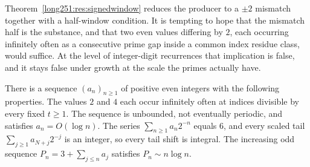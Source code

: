 \documentclass[11pt]{article}
\begin{document}
Theorem~\ref{long251:res:signedwindow} reduces the producer to a $\pm2$ mismatch
together with a half-window condition.  It is tempting to hope that the
mismatch half is the substance, and that two even values differing by $2$, each
occurring infinitely often as a consecutive prime gap inside a common index
residue class, would suffice.  At the level of integer-digit recurrences that
implication is false, and it stays false under growth at the scale the primes
actually have.

\begin{theorem}\label{long251:res:polignacfail}
There is a sequence $(a_n)_{n\ge1}$ of positive even integers with the
following properties.  The values $2$ and $4$ each occur infinitely often at
indices divisible by every fixed $t\ge1$.  The sequence is unbounded, not
eventually periodic, and satisfies $a_n=O(\log n)$.  The series
$\sum_{n\ge1}a_n2^{-n}$ equals $6$, and every scaled tail
$\sum_{j\ge1}a_{N+j}2^{-j}$ is an integer, so every tail shift is integral.
The increasing odd sequence $P_n=3+\sum_{j\le n}a_j$ satisfies
$P_n\sim n\log n$.
\end{theorem}
\end{document}
